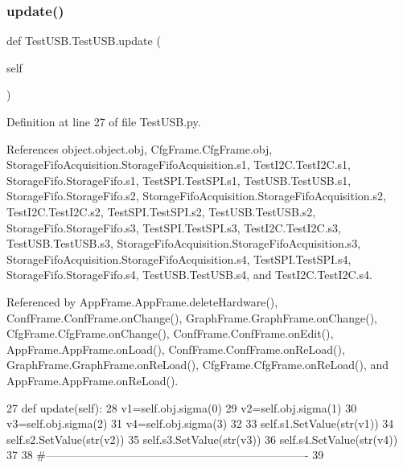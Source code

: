 \subsubsection{\texorpdfstring{update()}{update()}}
{\footnotesize\ttfamily def Test\+U\+S\+B.\+Test\+U\+S\+B.\+update (\begin{DoxyParamCaption}\item[{}]{self }\end{DoxyParamCaption})}



Definition at line 27 of file Test\+U\+S\+B.\+py.



References object.\+object.\+obj, Cfg\+Frame.\+Cfg\+Frame.\+obj, Storage\+Fifo\+Acquisition.\+Storage\+Fifo\+Acquisition.\+s1, Test\+I2\+C.\+Test\+I2\+C.\+s1, Storage\+Fifo.\+Storage\+Fifo.\+s1, Test\+S\+P\+I.\+Test\+S\+P\+I.\+s1, Test\+U\+S\+B.\+Test\+U\+S\+B.\+s1, Storage\+Fifo.\+Storage\+Fifo.\+s2, Storage\+Fifo\+Acquisition.\+Storage\+Fifo\+Acquisition.\+s2, Test\+I2\+C.\+Test\+I2\+C.\+s2, Test\+S\+P\+I.\+Test\+S\+P\+I.\+s2, Test\+U\+S\+B.\+Test\+U\+S\+B.\+s2, Storage\+Fifo.\+Storage\+Fifo.\+s3, Test\+S\+P\+I.\+Test\+S\+P\+I.\+s3, Test\+I2\+C.\+Test\+I2\+C.\+s3, Test\+U\+S\+B.\+Test\+U\+S\+B.\+s3, Storage\+Fifo\+Acquisition.\+Storage\+Fifo\+Acquisition.\+s3, Storage\+Fifo\+Acquisition.\+Storage\+Fifo\+Acquisition.\+s4, Test\+S\+P\+I.\+Test\+S\+P\+I.\+s4, Storage\+Fifo.\+Storage\+Fifo.\+s4, Test\+U\+S\+B.\+Test\+U\+S\+B.\+s4, and Test\+I2\+C.\+Test\+I2\+C.\+s4.



Referenced by App\+Frame.\+App\+Frame.\+delete\+Hardware(), Conf\+Frame.\+Conf\+Frame.\+on\+Change(), Graph\+Frame.\+Graph\+Frame.\+on\+Change(), Cfg\+Frame.\+Cfg\+Frame.\+on\+Change(), Conf\+Frame.\+Conf\+Frame.\+on\+Edit(), App\+Frame.\+App\+Frame.\+on\+Load(), Conf\+Frame.\+Conf\+Frame.\+on\+Re\+Load(), Graph\+Frame.\+Graph\+Frame.\+on\+Re\+Load(), Cfg\+Frame.\+Cfg\+Frame.\+on\+Re\+Load(), and App\+Frame.\+App\+Frame.\+on\+Re\+Load().


\begin{DoxyCode}
27     \textcolor{keyword}{def }update(self):
28         v1=self.obj.sigma(0)
29         v2=self.obj.sigma(1)
30         v3=self.obj.sigma(2)
31         v4=self.obj.sigma(3)
32 
33         self.s1.SetValue(str(v1))
34         self.s2.SetValue(str(v2))
35         self.s3.SetValue(str(v3))
36         self.s4.SetValue(str(v4))        
37 
38 \textcolor{comment}{#----------------------------------------------------------------------}
39 
\end{DoxyCode}


